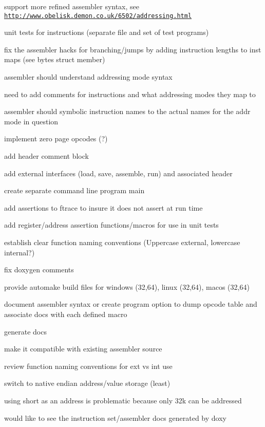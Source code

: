 
\begin{DoxyRefList}
\item[\label{todo__todo000001}%
\hypertarget{todo__todo000001}{}%
page \hyperlink{index}{6502} ]support more refined assembler syntax, see \href{http://www.obelisk.demon.co.uk/6502/addressing.html}{\tt http\-://www.\-obelisk.\-demon.\-co.\-uk/6502/addressing.\-html} 

unit tests for instructions (separate file and set of test programs) 

fix the assembler hacks for branching/jumps by adding instruction lengths to inst maps (see bytes struct member) 

assembler should understand addressing mode syntax 

need to add comments for instructions and what addressing modes they map to 

assembler should symbolic instruction names to the actual names for the addr mode in question 

implement zero page opcodes (?) 

add header comment block 

add external interfaces (load, save, assemble, run) and associated header 

create separate command line program main 

add assertions to ftrace to insure it does not assert at run time 

add register/address assertion functions/macros for use in unit tests 

establish clear function naming conventions (Uppercase external, lowercase internal?) 

fix doxygen comments 

provide automake build files for windows (32,64), linux (32,64), macos (32,64) 

document assembler syntax or create program option to dump opcode table and associate docs with each defined macro 

generate docs 

make it compatible with existing assembler source 

review function naming conventions for ext vs int use 

switch to native endian address/value storage (least) 

using short as an address is problematic because only 32k can be addressed 

would like to see the instruction set/assembler docs generated by doxy 
\end{DoxyRefList}